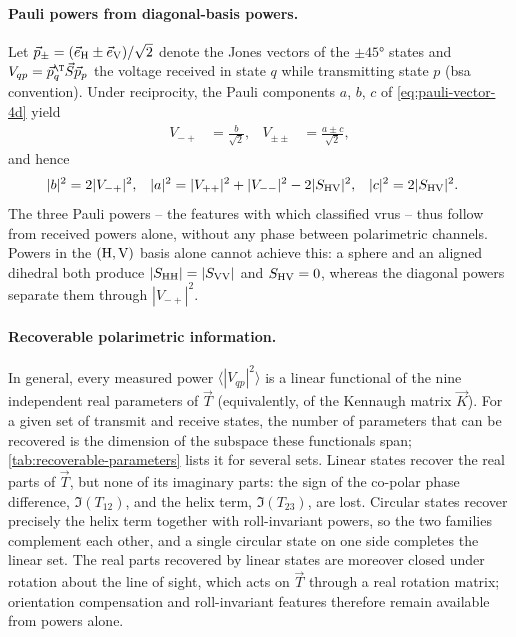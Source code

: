 \paragraph{Pauli powers from diagonal-basis powers.}
Let $\vec p_\pm = (\vec e_{\mathrm{H}} \pm \vec e_{\mathrm{V}})/\sqrt 2$ denote the Jones vectors of the $\pm\ang{45}$ states and $V_{qp} = \vec p_q^\T \vec S \vec p_p$ the voltage received in state $q$ while transmitting state $p$ (\gls{bsa} convention).
Under reciprocity, the Pauli components $a$, $b$, $c$ of \cref{eq:pauli-vector-4d} yield
\begin{align}
    V_{-+} &= \frac{b}{\sqrt 2},
&
    V_{\pm\pm} &= \frac{a \pm c}{\sqrt 2},
\end{align}
and hence
\begin{align}
    \label{eq:pauli-powers-from-powers}
    |b|^2 &= 2|V_{-+}|^2,
&
    |a|^2 &= |V_{++}|^2 + |V_{--}|^2 - 2|S_{\mathrm{HV}}|^2,
&
    |c|^2 &= 2|S_{\mathrm{HV}}|^2.
\end{align}
The three Pauli powers -- the features with which \textcite{bouwmeesterClassificationDynamicVulnerable2025} classified \glspl{vru} -- thus follow from received powers alone, without any phase between polarimetric channels.
Powers in the $(\mathrm{H}, \mathrm{V})$ basis alone cannot achieve this: a sphere and an aligned dihedral both produce $|S_{\mathrm{HH}}| = |S_{\mathrm{VV}}|$ and $S_{\mathrm{HV}} = 0$, whereas the diagonal powers separate them through $|V_{-+}|^2$.

\paragraph{Recoverable polarimetric information.}
In general, every measured power $\langle |V_{qp}|^2 \rangle$ is a linear functional of the nine independent real parameters of $\vec T$ (equivalently, of the Kennaugh matrix $\vec K$).
For a given set of transmit and receive states, the number of parameters that can be recovered is the dimension of the subspace these functionals span; \cref{tab:recoverable-parameters} lists it for several sets.
Linear states recover the real parts of $\vec T$, but none of its imaginary parts: the sign of the co-polar phase difference, $\Im(T_{12})$,  and the helix term, $\Im(T_{23})$, are lost.
Circular states recover precisely the helix term together with roll-invariant powers, so the two families complement each other, and a single circular state on one side completes the linear set.
The real parts recovered by linear states are moreover closed under rotation about the line of sight, which acts on $\vec T$ through a real rotation matrix; orientation compensation and roll-invariant features therefore remain available from powers alone.

